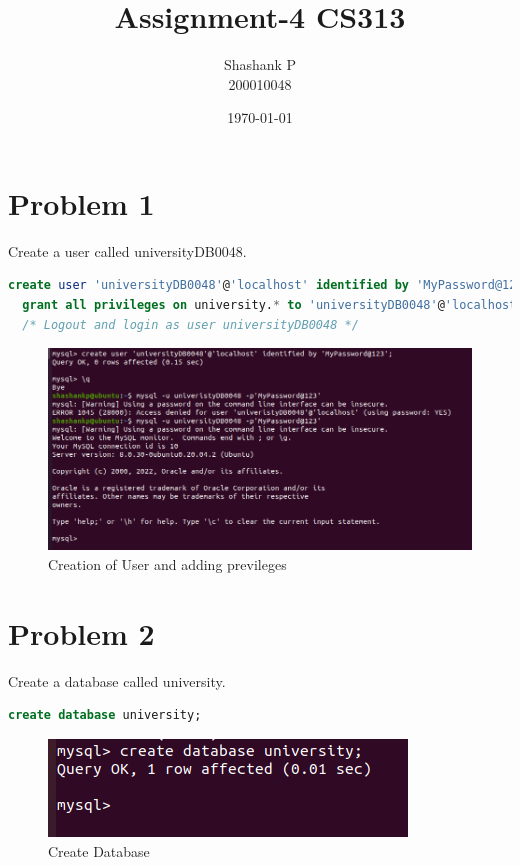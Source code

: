 \documentclass{article}
\title{Assignment-4 CS313}
\author{Shashank P \\ 200010048}
\date{\today}
\begin{document}
\maketitle




\section{Problem 1}
Create a user called universityDB0048.
\begin{lstlisting}[language=sql]
  create user 'universityDB0048'@'localhost' identified by 'MyPassword@123';
  grant all privileges on university.* to 'universityDB0048'@'localhost';
  /* Logout and login as user universityDB0048 */
\end{lstlisting}
\begin{figure}[!ht]
  \begin{center}
  \includegraphics[scale=0.8]{Q1.png}
  \caption{Creation of User and adding previleges}
  \end{center}
\end{figure}

\newpage
\section{Problem 2}
Create a database called university.
\begin{lstlisting}[language=sql]
  create database university;
\end{lstlisting}
\begin{figure}[!ht]
  \begin{center}
  \includegraphics[scale=0.8]{Q2.png}
  \caption{Create Database}
  \end{center}
\end{figure}
\end{document}
